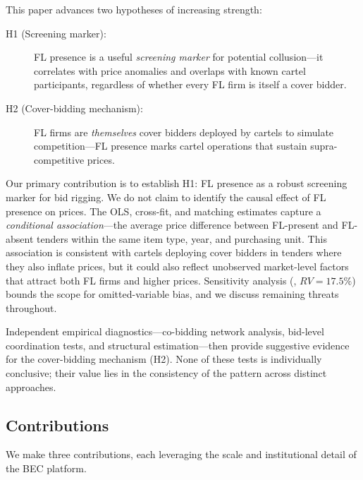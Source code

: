 This paper advances two hypotheses of increasing strength:

\begin{description}
  \item[H1 (Screening marker):] FL presence is a useful
    \emph{screening marker} for potential collusion---it correlates
    with price anomalies and overlaps with known cartel participants,
    regardless of whether every FL firm is itself a cover bidder.
  \item[H2 (Cover-bidding mechanism):] FL firms are \emph{themselves}
    cover bidders deployed by cartels to simulate competition---FL
    presence marks cartel operations that sustain supra-competitive
    prices.
\end{description}

\noindent Our primary contribution is to establish H1: FL presence as a
robust screening marker for bid rigging. We do not claim to identify
the causal effect of FL presence on prices. The OLS, cross-fit, and
matching estimates capture a \emph{conditional association}---the
average price difference between FL-present and FL-absent tenders
within the same item type, year, and purchasing unit. This association
is consistent with cartels deploying cover bidders in tenders where
they also inflate prices, but it could also reflect unobserved
market-level factors that attract both FL firms and higher prices.
Sensitivity analysis (\citealt{cinelli2020making}, $RV = 17.5\%$)
bounds the scope for omitted-variable bias, and we discuss remaining
threats throughout.

Independent empirical diagnostics---co-bidding network analysis,
bid-level coordination tests, and structural estimation---then provide
suggestive evidence for the cover-bidding mechanism (H2). None of these
tests is individually conclusive; their value lies in the consistency
of the pattern across distinct approaches.

\subsection{Contributions}

We make three contributions, each leveraging the scale and
institutional detail of the BEC platform.

